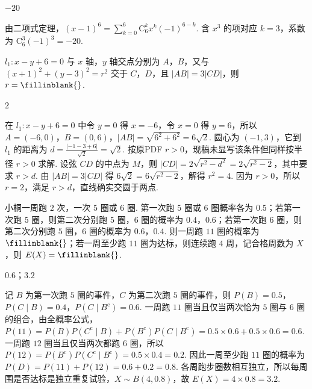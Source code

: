 \documentclass[UTF8,a4paper,oneside,11pt]{ctexbook}
\begin{document}
\begin{answer}
\(-20\)
\end{answer}

\begin{solution}
由二项式定理，\((x-1)^{6}=\sum_{k=0}^{6}\mathrm C_{6}^{k}x^{k}(-1)^{6-k}\). 含 \(x^{3}\) 的项对应 \(k=3\)，系数为 \(\mathrm C_{6}^{3}(-1)^{3}=-20\).
\end{solution}

\begin{problem}
\(l_1:x-y+6=0\) 与 \(x\) 轴，\(y\) 轴交点分别为 \(A\)，\(B\)，又与 \((x+1)^2+(y-3)^2=r^2\) 交于 \(C\)，\(D\)，且 \(|AB|=3|CD|\)，则 \(r=\fillinblank{}\).
\end{problem}

\begin{answer}
\(2\)
\end{answer}

\begin{solution}
在 \(l_{1}:x-y+6=0\) 中令 \(y=0\) 得 \(x=-6\)，令 \(x=0\) 得 \(y=6\)，所以 \(A=(-6,0)\)，\(B=(0,6)\)，\(|AB|=\sqrt{6^{2}+6^{2}}=6\sqrt{2}\). 圆心为 \((-1,3)\)，它到 \(l_{1}\) 的距离为 \(d=\frac{|-1-3+6|}{\sqrt{2}}=\sqrt{2}\). 按原PDF \(r>0\)，现稿未显写该条件但同样按半径 \(r>0\) 求解. 设弦 \(CD\) 的中点为 \(M\)，则 \(|CD|=2\sqrt{r^{2}-d^{2}}=2\sqrt{r^{2}-2}\)，其中要求 \(r>d\). 由 \(|AB|=3|CD|\) 得 \(6\sqrt{2}=6\sqrt{r^{2}-2}\)，解得 \(r^{2}=4\). 因为 \(r>0\)，所以 \(r=2\)，满足 \(r>d\)，直线确实交圆于两点.
\end{solution}

\begin{problem}
小桐一周跑 \(2\) 次，一次 \(5\) 圈或 \(6\) 圈. 第一次跑 \(5\) 圈或 \(6\) 圈概率各为 \(0.5\)；若第一次跑 \(5\) 圈，则第二次分别跑 \(5\) 圈，\(6\) 圈的概率为 \(0.4\)，\(0.6\)；若第一次跑 \(6\) 圈，则第二次分别跑 \(5\) 圈，\(6\) 圈的概率为 \(0.6\)，\(0.4\).
则一周跑 \(11\) 圈的概率为 \(\fillinblank{}\)；若一周至少跑 \(11\) 圈为达标，则连续跑 \(4\) 周，记合格周数为 \(X\)，则 \(E(X)=\fillinblank{}\).
\end{problem}

\begin{answer}
\(0.6\)；\(3.2\)
\end{answer}

\begin{solution}
记 \(B\) 为第一次跑 \(5\) 圈的事件，\(C\) 为第二次跑 \(5\) 圈的事件，则 \(P(B)=0.5\)，\(P(C\mid B)=0.4\)，\(P(C\mid B^{\mathrm c})=0.6\). 一周跑 \(11\) 圈当且仅当两次恰为 \(5\) 圈与 \(6\) 圈的组合，由全概率公式，\(P(11)=P(B)P(C^{\mathrm c}\mid B)+P(B^{\mathrm c})P(C\mid B^{\mathrm c})=0.5\times 0.6+0.5\times 0.6=0.6\). 一周跑 \(12\) 圈当且仅当两次都跑 \(6\) 圈，所以 \(P(12)=P(B^{\mathrm c})P(C^{\mathrm c}\mid B^{\mathrm c})=0.5\times 0.4=0.2\). 因此一周至少跑 \(11\) 圈的概率为 \(P(D)=P(11)+P(12)=0.6+0.2=0.8\). 各周跑步圈数相互独立，所以每周围是否达标是独立重复试验，\(X\sim B(4,0.8)\)，故 \(E(X)=4\times 0.8=3.2\).
\end{solution}
\end{document}
